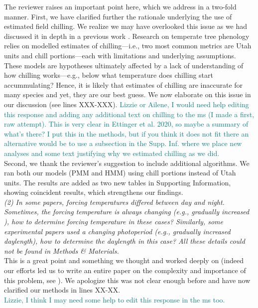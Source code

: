 \documentclass[11pt]{article}
\begin{document}
The reviewer raises an important point here, which we address in a two-fold manner. First, we have clarified further the rationale underlying the use of estimated field chilling. We realize we may have overlooked this issue as we had discussed it in depth in a previous work \citep{ettinger2020}. Research on temperate tree phenology relies on modelled estimates of chilling---i.e., two most common metrics are Utah units and chill portions---each with limitations and underlying assumptions. These models are hypotheses ultimately affected by a lack of understanding of how chilling works---e.g., below what temperature does chilling start accummulating? Hence, it is likely that estimates of chilling are inaccurate for many species and yet, they are our best guess. We now elaborate on this issue in our discussion (see lines XXX-XXX).
\textcolor{teal}{Lizzie or Ailene, I would need help editing this response and adding any additional text on chilling to the ms (I made a first, raw attempt). This is very clear in Ettinger et al. 2020, so maybe a summary of what's there? I put this in the methods, but if you think it does not fit there an alternative would be to use a subsection in the Supp. Inf. where we place new analyses and some text justifying why we estimated chilling as we did.}\\

Second, we thank the reviewer's suggestion to include additional algorithms. We ran both our models (PMM and HMM) using chill portions instead of Utah units. The results are added as two new tables in Supporting Information, showing coincident results, which strengthens our findings.\\  


\emph{(2) In some papers, forcing temperatures differed between day and night. Sometimes, the forcing temperature is always changing (e.g., gradually increased ), how to determine forcing temperature in these cases? Similarly, some experimental papers used a changing photoperiod (e.g., gradually increased daylength), how to determine the daylength in this case? All these details could not be found in Methods \& Materials.}\\

This is a great point and something we thought and worked deeply on (indeed our efforts led us to write an entire paper on the complexity and importance of this problem, see ). We apologize this was not clear enough before and have now clarified our methods in lines XX-XX.  \\
\textcolor{teal}{Lizzie, I think I may need some help to edit this response in the ms too.}\\
\end{document}
